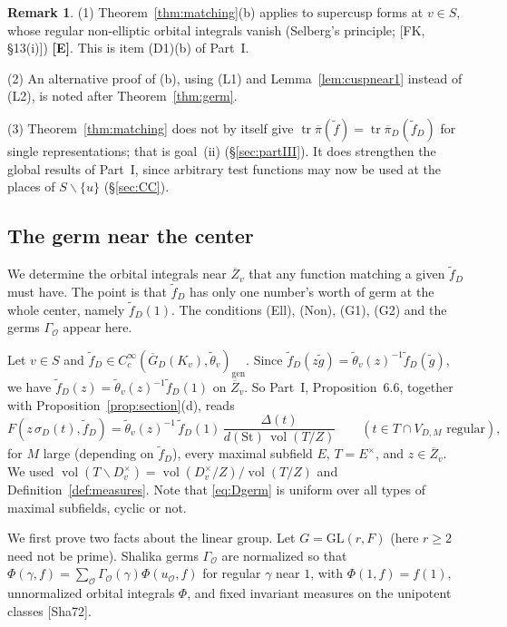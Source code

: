 \documentclass[12pt]{article}
\newcommand{\ov}[1]{\overline{#1}}
\newcommand{\gen}{\mathrm{gen}}
\newcommand{\tr}{\operatorname{tr}}
\newcommand{\vol}{\operatorname{vol}}
\newcommand{\GL}{\mathrm{GL}}
\newcommand{\St}{\mathrm{St}}
\newcommand{\Zb}{\ov{Z}}
\newcommand{\GDb}{\ov{G}_D}
\newcommand{\pib}{\ov{\pi}}
\newcommand{\sg}{\sigma}
\newcommand{\Ev}{\textbf{[E]}}
\theoremstyle{plain}
\theoremstyle{definition}
\newtheorem{remark}[theorem]{Remark}
\begin{document}
\begin{remark}
(1) Theorem~\ref{thm:matching}(b) applies to supercusp forms at $v\in S$, whose regular non-elliptic orbital integrals vanish (Selberg's principle; [FK, \S13(i)]) \Ev. This is item (D1)(b) of Part~I.

(2) An alternative proof of (b), using (L1) and Lemma~\ref{lem:cuspnear1} instead of (L2), is noted after Theorem~\ref{thm:germ}.

(3) Theorem~\ref{thm:matching} does not by itself give $\tr\pib(\tilde f)=\tr\pib_D(\tilde f_D)$ for single representations; that is goal~(ii) (\S\ref{sec:partIII}). It does strengthen the global results of Part~I, since arbitrary test functions may now be used at the places of $S\smallsetminus\{u\}$ (\S\ref{sec:CC}).
\end{remark}


\subsection{The germ near the center}\label{subsec:germ}
We determine the orbital integrals near $\Zb_v$ that any function matching a given $\tilde f_D$ must have. The point is that $\tilde f_D$ has only one number's worth of germ at the whole center, namely $\tilde f_D(1)$. The conditions (Ell), (Non), (G1), (G2) and the germs $\Gamma_{\mathcal O}$ appear here.

Let $v\in S$ and $\tilde f_D\in C_c^\infty(\GDb(K_v),\tilde\theta_v)_\gen$. Since $\tilde f_D(z\tilde g)=\tilde\theta_v(z)^{-1}\tilde f_D(\tilde g)$, we have $\tilde f_D(z)=\tilde\theta_v(z)^{-1}\tilde f_D(1)$ on $\Zb_v$. So Part~I, Proposition~6.6, together with Proposition~\ref{prop:section}(d), reads
\begin{equation}\label{eq:Dgerm}
F(z\,\sg_D(t),\tilde f_D)=\tilde\theta_v(z)^{-1}\,\tilde f_D(1)\,\frac{\Delta(t)}{d(\St)\,\vol(T/Z)}\qquad(t\in T\cap V_{D,M}\text{ regular}),
\end{equation}
for $M$ large (depending on $\tilde f_D$), every maximal subfield $E$, $T=E^\times$, and $z\in\Zb_v$. We used $\vol(T\backslash D_v^\times)=\vol(D_v^\times/Z)/\vol(T/Z)$ and Definition~\ref{def:measures}. Note that \eqref{eq:Dgerm} is uniform over all types of maximal subfields, cyclic or not.


We first prove two facts about the linear group. Let $G=\GL(r,F)$ (here $r\ge2$ need not be prime). Shalika germs $\Gamma_{\mathcal O}$ are normalized so that $\Phi(\gamma,f)=\sum_{\mathcal O}\Gamma_{\mathcal O}(\gamma)\Phi(u_{\mathcal O},f)$ for regular $\gamma$ near $1$, with $\Phi(1,f)=f(1)$, unnormalized orbital integrals $\Phi$, and fixed invariant measures on the unipotent classes [Sha72].
\end{document}
